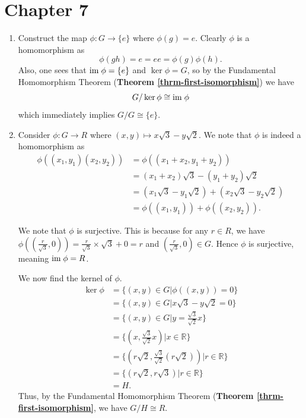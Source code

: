 \section*{Chapter 7}
\begin{enumerate}
    \item Construct the map $\phi: G \to \{e\}$ where $\phi(g) = e$. Clearly $\phi$ is a homomorphism as
    \[
        \phi(gh) = e = ee = \phi(g)\phi(h).
    \]
    Also, one sees that $\mathrm{im}\;\phi = \{e\}$ and $\ker\phi = G$, so by the Fundamental Homomorphism Theorem (\textbf{Theorem \ref{thrm-first-isomorphism}}) we have
    \[
        G / \ker\phi \cong \mathrm{im}\;\phi
    \]
    which immediately implies $G/G \cong \{e\}$.

    \item Consider $\phi: G \to R$ where $(x, y) \mapsto x\sqrt3 - y\sqrt2$. We note that $\phi$ is indeed a homomorphism as
    \begin{align*}
        \phi((x_1,y_1)(x_2,y_2)) &= \phi((x_1+x_2,y_1+y_2))\\
        &= (x_1+x_2)\sqrt3 - (y_1+y_2)\sqrt2\\
        &= (x_1\sqrt3 - y_1\sqrt2) + (x_2\sqrt3 - y_2\sqrt2)\\
        &= \phi((x_1, y_1)) + \phi((x_2, y_2)).
    \end{align*}
    
    We note that $\phi$ is surjective. This is because for any $r \in R$, we have $\phi((\frac{r}{\sqrt3}, 0)) = \frac{r}{\sqrt3} \times \sqrt3 + 0 = r$ and $(\frac{r}{\sqrt3}, 0) \in G$. Hence $\phi$ is surjective, meaning $\mathrm{im}\;\phi = R$.
    
    We now find the kernel of $\phi$.
    \begin{align*}
        \ker\phi &= \{(x, y) \in G \vert \phi((x, y)) = 0\}\\
        &= \{(x, y) \in G \vert x\sqrt3-y\sqrt2 = 0\}\\
        &= \{(x, y) \in G \vert y = \frac{\sqrt{3}}{\sqrt{2}}x\}\\
        &= \{(x, \frac{\sqrt{3}}{\sqrt{2}}x) \vert x \in \mathbb{R}\}\\
        &= \{(r\sqrt2, \frac{\sqrt{3}}{\sqrt{2}}(r\sqrt2)) \vert r \in \mathbb{R}\}\\
        &= \{(r\sqrt2, r\sqrt3) \vert r \in \mathbb{R}\}\\
        &= H.
    \end{align*}
    Thus, by the Fundamental Homomorphism Theorem (\textbf{Theorem \ref{thrm-first-isomorphism}}, we have $G / H \cong R$.


\end{enumerate}
